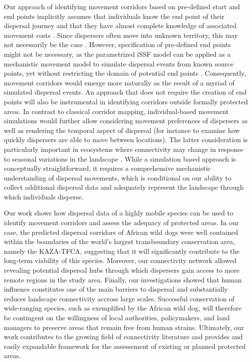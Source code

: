 \documentclass[abstract=on,10pt,a4paper,bibliography=totocnumbered]{article}
\begin{document}
Our approach of identifying movement corridors based on pre-defined start and
end points implicitly assumes that individuals know the end point of their
dispersal journey and that they have almost complete knowledge of associated
movement costs \citep{Panzacchi.2016}. Since dispersers often move into unknown
territory, this may not necessarily be the case \citep{Abrahms.2017,
Woodroffe.2019, Cozzi.2020}. However, specification of pre-defined end points
might not be necessary, as the parametrized iSSF model can be applied as a
mechanistic movement model to simulate dispersal events from known source
points, yet without restricting the domain of potential end points
\citep{Signer.2017}. Consequently, movement corridors would emerge more
naturally as the result of a myriad of simulated dispersal events. An approach
that does not require the creation of end points will also be instrumental in
identifying corridors outside formally protected areas. In contrast to classical
corridor mapping, individual-based movement simulations would further allow
considering movement preferences of dispersers as well as rendering the temporal
aspect of dispersal (for instance to examine how quickly dispersers are able to
move between locations). The latter consideration is particularly important in
ecosystems where connectivity may change in response to seasonal variations in
the landscape \citep{Osipova.2019}. While a simulation based approach is
conceptually straightforward, it requires a comprehensive mechanistic
understanding of dispersal movements, which is conditional on our ability to
collect additional dispersal data and adequately represent the landscape through
which individuals disperse.

Our work shows how dispersal data of a highly mobile species can be used to
identify movement corridors and assess the adequacy of protected areas. In our
case, the predicted dispersal corridors of African wild dogs were well contained
within the boundaries of the world's largest transboundary conservation area,
namely the KAZA-TFCA, suggesting that it will significantly contribute to the
long-term viability of this species. Moreover, our connectivity network allowed
revealing potential dispersal hubs through which dispersers gain access to more
remote regions in the study area. Finally, our investigations showed that human
influence constitutes one of the main barriers to dispersal and substantially
reduces landscape connectivity accross large scales. Successful conservation of
wide-ranging species, such as exemplified by the African wild dog, will
therefore be contingent on the willingness of local authorities, policymakers,
and land managers to preserve areas that remain free from human strains.
Ultimately, our work contributes to the growing field of connectivity literature
and provides and easily expandable framework for the assessement of existing or
planned protected areas.
\end{document}
